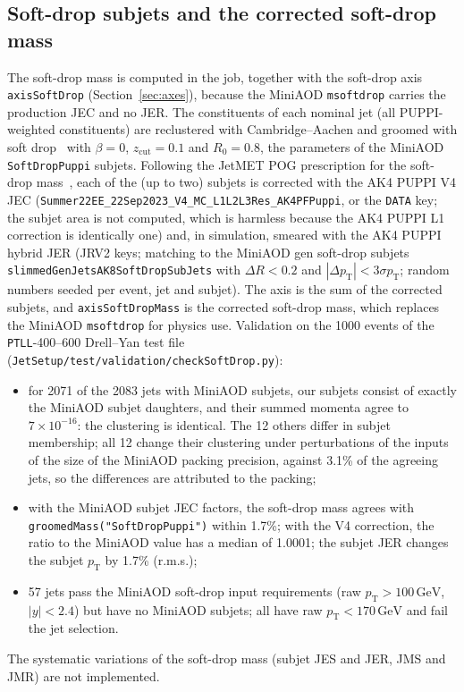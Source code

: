 \documentclass[11pt]{article}
\newcommand{\pt}{p_{\mathrm{T}}}
\newcommand{\GeV}{\ensuremath{\,\mathrm{GeV}}}
\newcommand{\code}[1]{\texttt{#1}}
\begin{document}
\subsection{Soft-drop subjets and the corrected soft-drop mass}
\label{sec:softdrop}
The soft-drop mass is computed in the job, together with the soft-drop axis \code{axisSoftDrop}
(Section~\ref{sec:axes}), because the MiniAOD \code{msoftdrop} carries the production JEC and no JER. The constituents
of each nominal jet (all PUPPI-weighted constituents) are reclustered with Cambridge--Aachen and groomed with soft
drop~\cite{Larkoski:2014wba} with $\beta = 0$, $z_\mathrm{cut} = 0.1$ and
$R_0 = 0.8$, the parameters of the MiniAOD \code{SoftDropPuppi} subjets. Following the JetMET POG prescription for the
soft-drop mass~\cite{JMEjerc}, each of the (up to two) subjets is corrected with the AK4 PUPPI V4 JEC
(\code{Summer22EE\_22Sep2023\_V4\_MC\_L1L2L3Res\_AK4PFPuppi}, or the \code{DATA} key; the subjet area is not computed,
which is harmless because the AK4 PUPPI L1 correction is identically one) and, in simulation, smeared with the AK4 PUPPI
hybrid JER (JRV2 keys; matching to the MiniAOD gen soft-drop subjets \code{slimmedGenJetsAK8SoftDropSubJets} with
$\Delta R < 0.2$ and $|\Delta\pt| < 3\sigma\pt$; random numbers seeded per event, jet and subjet). The axis is the sum of
the corrected subjets, and \code{axisSoftDropMass} is the corrected soft-drop mass, which replaces the MiniAOD
\code{msoftdrop} for physics use. Validation on the 1000 events of the \code{PTLL}-400--600
Drell--Yan test file (\code{JetSetup/\allowbreak{}test/\allowbreak{}validation/\allowbreak{}checkSoftDrop.py}):
\begin{itemize}
\item for 2071 of the 2083 jets with MiniAOD subjets, our subjets consist of exactly the MiniAOD subjet daughters, and
  their summed momenta agree to $7\times10^{-16}$: the clustering is identical. The 12 others differ in subjet
  membership; all 12 change their clustering under perturbations of the inputs of the size of the MiniAOD packing
  precision, against 3.1\% of the agreeing jets, so the differences are attributed to the packing;
\item with the MiniAOD subjet JEC factors, the soft-drop mass agrees with \code{groomedMass("SoftDropPuppi")} within
  1.7\%; with the V4 correction, the ratio to the MiniAOD value has a median of 1.0001; the subjet JER changes the subjet
  $\pt$ by 1.7\% (r.m.s.);
\item 57 jets pass the MiniAOD soft-drop input requirements (raw $\pt > 100\GeV$, $|y| < 2.4$) but have no MiniAOD
  subjets; all have raw $\pt < 170\GeV$ and fail the jet selection.
\end{itemize}
The systematic variations of the soft-drop mass (subjet JES and JER, JMS and JMR) are not implemented.
\end{document}
